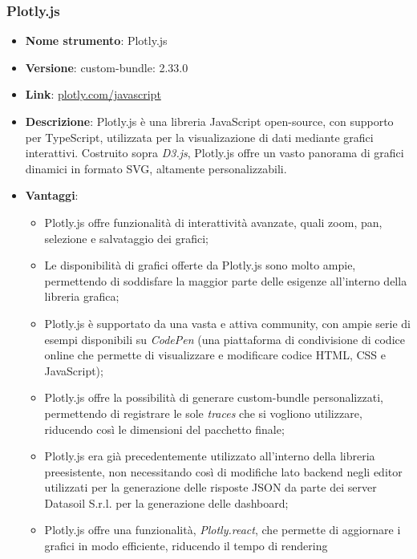 \subsubsection{Plotly.js}
\begin{itemize}
      \item \textbf{Nome strumento}: Plotly.js
      \item \textbf{Versione}: custom-bundle: 2.33.0
      \item \textbf{Link}: \href{https://plotly.com/javascript/}{plotly.com/javascript}
      \item \textbf{Descrizione}: Plotly.js è una libreria JavaScript open-source, con supporto per TypeScript, utilizzata per la visualizazione di dati mediante grafici interattivi.
            Costruito sopra \textit{D3.js}, Plotly.js offre un vasto panorama di grafici dinamici in formato SVG, altamente personalizzabili.
      \item \textbf{Vantaggi}:
            \begin{itemize}
                  \item Plotly.js offre funzionalità di interattività avanzate, quali zoom, pan, selezione e salvataggio dei grafici;
                  \item Le disponibilità di grafici offerte da Plotly.js sono molto ampie, permettendo di soddisfare la maggior parte delle esigenze
                        all'interno della libreria grafica;
                  \item Plotly.js è supportato da una vasta e attiva community, con ampie serie di esempi disponibili su \textit{CodePen} (una piattaforma di condivisione di codice
                        online che permette di visualizzare e modificare codice HTML, CSS e JavaScript);
                  \item Plotly.js offre la possibilità di generare custom-bundle personalizzati, permettendo di registrare le sole \textit{traces} che si vogliono utilizzare, riducendo
                        così le dimensioni del pacchetto finale;
                  \item Plotly.js era già precedentemente utilizzato all'interno della libreria preesistente, non necessitando così di modifiche lato backend negli editor
                        utilizzati per la generazione delle risposte JSON da parte dei server Datasoil S.r.l. per la generazione delle dashboard;
                  \item Plotly.js offre una funzionalità, \textit{Plotly.react}, che permette di aggiornare i grafici in modo efficiente, riducendo il tempo di rendering

\end{itemize}
\end{itemize}
